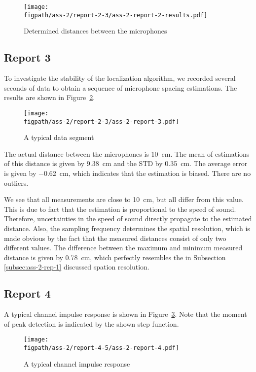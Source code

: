 \documentclass[11pt,titlepage]{report}
\newcommand{\figpath}{../../deliverable-7-resources/figures}
\begin{document}
\begin{figure}[H]
	\centering
	\texttt{[image: \\figpath/ass-2/report-2-3/ass-2-report-2-results.pdf]}
	\caption{Determined distances between the microphones}
	\label{fig:ass-2-rep-2-res}
\end{figure}

\subsection{Report 3}
To investigate the stability of the localization algorithm, we recorded several seconds of data to obtain a sequence of microphone spacing estimations. The results are shown in Figure~\ref{fig:ass-2-rep-3}.

\begin{figure}[H]
	\begin{center}
		\texttt{[image: \\figpath/ass-2/report-2-3/ass-2-report-3.pdf]}
	\end{center}
	\caption{A typical data segment}
	\label{fig:ass-2-rep-3}
\end{figure}

The actual distance between the microphones is \SI{10}{cm}. The mean of estimations of this distance is given by \SI{9.38}{cm} and the STD by \SI{0.35}{cm}. The average error is given by \SI{-0.62}{cm}, which indicates that the estimation is biased. There are no outliers.

We see that all measurements are close to \SI{10}{cm}, but all differ from this value. This is due to fact that the estimation is proportional to the speed of sound. Therefore, uncertainties in the speed of sound directly propagate to the estimated distance. Also, the sampling frequency determines the spatial resolution, which is made obvious by the fact that the measured distances consist of only two different values. The difference between the maximum and minimum measured distance is given by \SI{0.78}{cm}, which perfectly resembles the in Subsection \ref{subsec:ass-2-rep-1} discussed spation resolution.

\subsection{Report 4}
A typical channel impulse response is shown in Figure~\ref{fig:ass-2-rep-4}. Note that the moment of peak detection is indicated by the shown step function.

\begin{figure}[H]
	\begin{center}
		\texttt{[image: \\figpath/ass-2/report-4-5/ass-2-report-4.pdf]}
	\end{center}
	\caption{A typical channel impulse response}
	\label{fig:ass-2-rep-4}
\end{figure}
\end{document}
